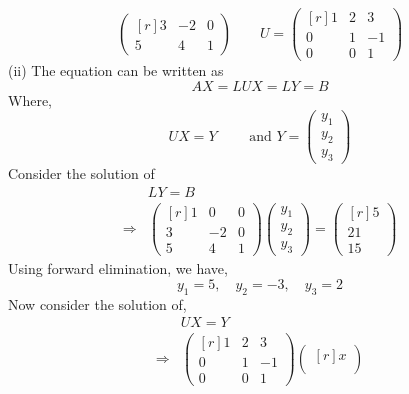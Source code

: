 \documentclass[12pt,class=book,crop=false]{standalone}
\begin{document}
\begin{soln}
\[\begin{pmatrix*}[r]
            3&-2&0\\
            5&4&1
        \end{pmatrix*}\qquad U=\begin{pmatrix*}[r]
            1&2&3\\
            0&1&-1\\
            0&0&1
        \end{pmatrix*}
    \]
    (ii) The equation can be written as
    \[
        AX=LUX=LY=B
    \]
    Where,
    \[
        UX=Y\qquad\text{ and }Y=\begin{pmatrix}
            y_1 \\
            y_2 \\
            y_3
        \end{pmatrix}
    \]
    Consider the solution of
    \begin{align*}
                    & LY=B                                                                             \\
        \Rightarrow & \begin{pmatrix*}[r]
            1&0&0\\
            3&-2&0\\
            5&4&1
        \end{pmatrix*} \begin{pmatrix}
            y_1 \\
            y_2 \\
            y_3
        \end{pmatrix}=\begin{pmatrix*}[r]
            5\\
            21\\
            15
        \end{pmatrix*}
    \end{align*}
    Using forward elimination, we have,
    \[
        y_1=5,\quad y_2=-3,\quad y_3=2
    \]
    Now consider the solution of,
    \begin{align*}
                    & UX=Y                                                                            \\
        \Rightarrow & \begin{pmatrix*}[r]
            1&2&3\\
            0&1&-1\\
            0&0&1
        \end{pmatrix*}\begin{pmatrix*}[r]
            x\\

\end{pmatrix*}
\end{align*}
\end{soln}
\end{document}
